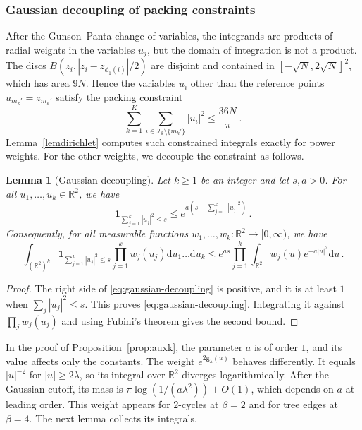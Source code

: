 \documentclass[a4paper,10pt,leqno]{amsart}
\numberwithin{equation}{section}
\newtheorem{lem}[prop]{Lemma}
\newcommand{\R}{\mathbb{R}}
\newcommand{\dd}{\mathrm{d}}
\def\indic{\mathbf{1}}
\def\g{\mathsf{g}}
\begin{document}
\subsubsection*{Gaussian decoupling of packing constraints}
After the Gunson--Panta change of variables, the integrands are products of radial weights in the variables $u_j$, but the domain of integration is not a product. The discs $B(z_i,|z_i-z_{\phi_1(i)}|/2)$ are disjoint and contained in $[-\sqrt N,2\sqrt N]^2$, which has area $9N$. Hence the variables $u_i$ other than the reference points $u_{m_k'}=z_{m_k'}$ satisfy the packing constraint
\[
  \sum_{k=1}^K\sum_{i\in\mathcal I_k\setminus\{m_k'\}}|u_i|^2\le\frac{36N}{\pi}\,.
\]
Lemma~\ref{lemdirichlet} computes such constrained integrals exactly for power weights. For the other weights, we decouple the constraint as follows.

\begin{lem}[Gaussian decoupling]\label{lem:gaussian decoupling}
  Let $k\ge1$ be an integer and let $s,a>0$. For all $u_1,\ldots,u_k\in\R^2$, we have
  \begin{equation}\label{eq:gaussian-decoupling}
    \indic_{\sum_{j=1}^k|u_j|^2\le s}\le e^{a(s-\sum_{j=1}^k|u_j|^2)}\,.
  \end{equation}
  Consequently, for all measurable functions $w_1,\ldots,w_k:\R^2\to[0,\infty)$, we have
  \[
    \int_{(\R^2)^k}\indic_{\sum_{j=1}^k|u_j|^2\le s}\prod_{j=1}^kw_j(u_j)\dd u_1\ldots\dd u_k
    \le e^{as}\prod_{j=1}^k\int_{\R^2}w_j(u)e^{-a|u|^2}\dd u\,.
  \]
\end{lem}

\begin{proof}
  The right side of \eqref{eq:gaussian-decoupling} is positive, and it is at least $1$ when $\sum_j|u_j|^2\le s$. This proves \eqref{eq:gaussian-decoupling}. Integrating it against $\prod_jw_j(u_j)$ and using Fubini's theorem gives the second bound.
\end{proof}

In the proof of Proposition~\ref{prop:auxk}, the parameter $a$ is of order $1$, and its value affects only the constants. The weight $e^{2\g_\lambda(u)}$ behaves differently. It equals $|u|^{-2}$ for $|u|\ge2\lambda$, so its integral over $\R^2$ diverges logarithmically. After the Gaussian cutoff, its mass is $\pi\log(1/(a\lambda^2))+O(1)$, which depends on $a$ at leading order. This weight appears for $2$-cycles at $\beta=2$ and for tree edges at $\beta=4$. The next lemma collects its integrals.
\end{document}
